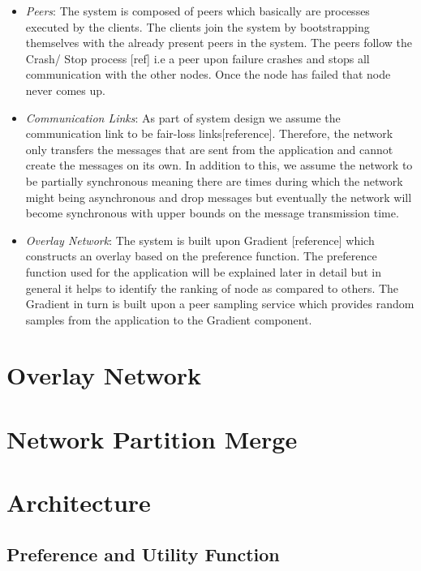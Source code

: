 \documentclass[12pt,a4paper,twoside,openright]{book}
\begin{document}
\begin{itemize}

\item \textit{Peers}: The system is composed of peers which basically are processes executed by the clients. The clients join the system by bootstrapping themselves with the already present peers in the system. The peers follow the Crash/ Stop process [ref] i.e a peer upon failure crashes and stops all communication with the other nodes. Once the node has failed that node never comes up. 


\item \textit{Communication Links}: As part of system design we assume the communication link to be fair-loss links[reference]. Therefore, the network only transfers the messages that are sent from the application and cannot create the messages on its own. In addition to this, we assume the network to be partially synchronous meaning there are times during which the network might being asynchronous and drop messages but eventually the network will become synchronous with upper bounds on the message transmission time.

\item \textit{Overlay Network}: The system is built upon Gradient [reference] which constructs an overlay based on the preference function. The preference function used for the application will be explained later in detail but in general it helps to identify the ranking of node as compared to others. The Gradient in turn is built upon a peer sampling service which provides random samples from the application to the Gradient component.

\end{itemize}



\section{Overlay Network}


\section{Network Partition Merge}

\section{Architecture}

\subsection{Preference and Utility Function}
\end{document}

